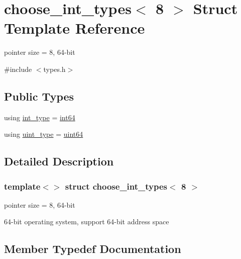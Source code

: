 \hypertarget{structchoose__int__types_3_018_01_4}{}\section{choose\+\_\+int\+\_\+types$<$ 8 $>$ Struct Template Reference}
\label{structchoose__int__types_3_018_01_4}


pointer size = 8, 64-\/bit  




{\ttfamily \#include $<$types.\+h$>$}

\subsection*{Public Types}
\begin{DoxyCompactItemize}
\item 
using \hyperlink{structchoose__int__types_3_018_01_4_a4dde5a87f22a82a381bbae5f6d205d05}{int\+\_\+type} = \hyperlink{types_8h_a552928ab323811c9694f5b7c9f53d0fb}{int64}
\item 
using \hyperlink{structchoose__int__types_3_018_01_4_a4e70f94b235eba865f95080e668f666a}{uint\+\_\+type} = \hyperlink{types_8h_a60e8696a4678cd348e991a1f172e53f7}{uint64}
\end{DoxyCompactItemize}


\subsection{Detailed Description}
\subsubsection*{template$<$$>$\newline
struct choose\+\_\+int\+\_\+types$<$ 8 $>$}

pointer size = 8, 64-\/bit 

64-\/bit operating system, support 64-\/bit address space 

\subsection{Member Typedef Documentation}
\mbox{\label{structchoose__int__types_3_018_01_4_a4dde5a87f22a82a381bbae5f6d205d05}} 

